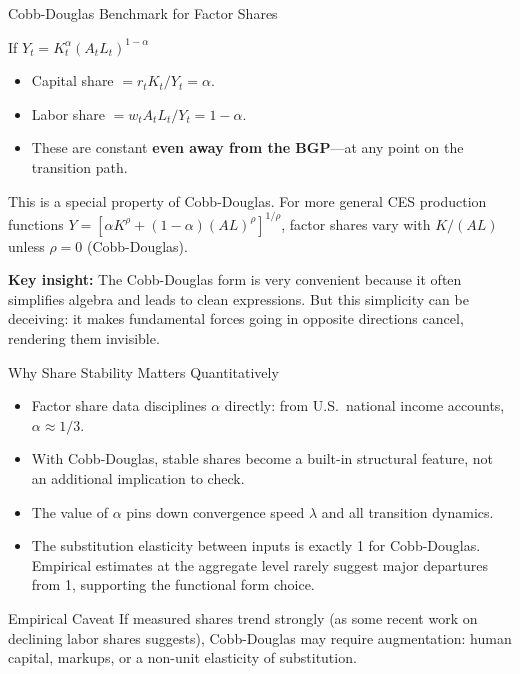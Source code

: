 \documentclass[aspectratio=169,10pt]{beamer}
\begin{document}
\begin{frame}{Cobb-Douglas Benchmark for Factor Shares}
\begin{block}{If $Y_t=K_t^{\alpha}(A_tL_t)^{1-\alpha}$}
\begin{itemize}
  \item Capital share $= r_tK_t/Y_t = \alpha$.
  \item Labor share $= w_tA_tL_t/Y_t = 1-\alpha$.
  \item These are constant \textbf{even away from the BGP}---at any point on the transition path.
\end{itemize}
\end{block}
This is a special property of Cobb-Douglas. For more general CES production functions $Y=[\alpha K^{\rho}+(1-\alpha)(AL)^{\rho}]^{1/\rho}$, factor shares vary with $K/(AL)$ unless $\rho=0$ (Cobb-Douglas).

\medskip
\textbf{Key insight:} The Cobb-Douglas form is very convenient because it often simplifies algebra and leads to clean expressions. But this simplicity can be deceiving: it makes fundamental forces going in opposite directions cancel, rendering them invisible.
\end{frame}

\begin{frame}{Why Share Stability Matters Quantitatively}
\begin{itemize}
  \item Factor share data disciplines $\alpha$ directly: from U.S.\ national income accounts, $\alpha\approx 1/3$.
  \item With Cobb-Douglas, stable shares become a built-in structural feature, not an additional implication to check.
  \item The value of $\alpha$ pins down convergence speed $\lambda$ and all transition dynamics.
  \item The substitution elasticity between inputs is exactly 1 for Cobb-Douglas. Empirical estimates at the aggregate level rarely suggest major departures from 1, supporting the functional form choice.
\end{itemize}
\begin{block}{Empirical Caveat}
If measured shares trend strongly (as some recent work on declining labor shares suggests), Cobb-Douglas may require augmentation: human capital, markups, or a non-unit elasticity of substitution.
\end{block}
\end{frame}

\end{document}
